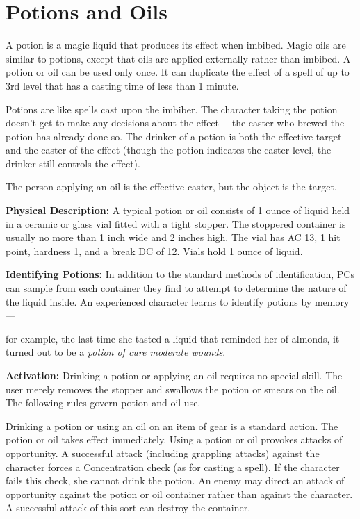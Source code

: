 
\section{Potions and Oils}

A potion is a magic liquid that produces its effect when imbibed. Magic oils are 
similar to potions, except that oils are applied externally rather than imbibed. 
A potion or oil can be used only once. It can duplicate the effect of a spell of 
up to 3rd level that has a casting time of less than 1 minute.

Potions are like spells cast upon the imbiber. The character taking the potion 
doesn't get to make any decisions about the effect ---the caster who brewed the 
potion has already done so. The drinker of a potion is both the effective target 
and the caster of the effect (though the potion indicates the caster level, the 
drinker still controls the effect).

The person applying an oil is the effective caster, but the object is the target.

\textbf{Physical Description:} A typical potion or oil consists of 1 ounce of liquid 
held in a ceramic or glass vial fitted with a tight stopper. The stoppered container 
is usually no more than 1 inch wide and 2 inches high. The vial has AC 13, 1 hit 
point, hardness 1, and a break DC of 12. Vials hold 1 ounce of liquid.

\textbf{Identifying Potions:} In addition to the standard methods of identification, 
PCs can sample from each container they find to attempt to determine the nature 
of the liquid inside. An experienced character learns to identify potions by memory---

for example, the last time she tasted a liquid that reminded her of almonds, it 
turned out to be a \textit{potion of cure moderate wounds}. 

\textbf{Activation:} Drinking a potion or applying an oil requires no special skill. 
The user merely removes the stopper and swallows the potion or smears on the oil. 
The following rules govern potion and oil use.

Drinking a potion or using an oil on an item of gear is a standard action. The 
potion or oil takes effect immediately. Using a potion or oil provokes attacks 
of opportunity. A successful attack (including grappling attacks) against the character 
forces a Concentration check (as for casting a spell). If the character fails this 
check, she cannot drink the potion. An enemy may direct an attack of opportunity 
against the potion or oil container rather than against the character. A successful 
attack of this sort can destroy the container. 

